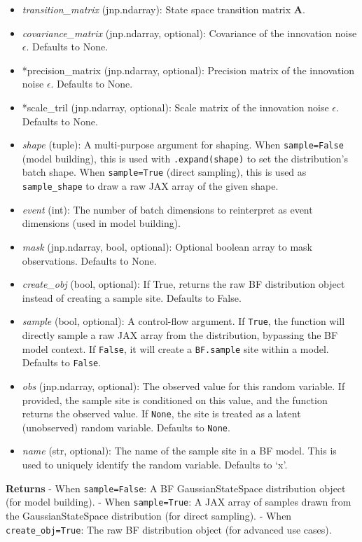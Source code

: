 \documentclass[
  letterpaper,
  DIV=11,
  numbers=noendperiod]{scrartcl}
\begin{document}
\begin{itemize}
\item
  \emph{transition\_matrix} (jnp.ndarray): State space transition matrix
  \(\mathbf{A}\).
\item
  \emph{covariance\_matrix} (jnp.ndarray, optional): Covariance of the
  innovation noise \({\epsilon}\). Defaults to None.
\item
  *precision\_matrix (jnp.ndarray, optional): Precision matrix of the
  innovation noise \(\epsilon\). Defaults to None.
\item
  *scale\_tril (jnp.ndarray, optional): Scale matrix of the innovation
  noise \(\epsilon\). Defaults to None.
\item
  \emph{shape} (tuple): A multi-purpose argument for shaping. When
  \texttt{sample=False} (model building), this is used with
  \texttt{.expand(shape)} to set the distribution's batch shape. When
  \texttt{sample=True} (direct sampling), this is used as
  \texttt{sample\_shape} to draw a raw JAX array of the given shape.
\item
  \emph{event} (int): The number of batch dimensions to reinterpret as
  event dimensions (used in model building).
\item
  \emph{mask} (jnp.ndarray, bool, optional): Optional boolean array to
  mask observations. Defaults to None.
\item
  \emph{create\_obj} (bool, optional): If True, returns the raw BF
  distribution object instead of creating a sample site. Defaults to
  False.
\item
  \emph{sample} (bool, optional): A control-flow argument. If
  \texttt{True}, the function will directly sample a raw JAX array from
  the distribution, bypassing the BF model context. If \texttt{False},
  it will create a \texttt{BF.sample} site within a model. Defaults to
  \texttt{False}.
\item
  \emph{obs} (jnp.ndarray, optional): The observed value for this random
  variable. If provided, the sample site is conditioned on this value,
  and the function returns the observed value. If \texttt{None}, the
  site is treated as a latent (unobserved) random variable. Defaults to
  \texttt{None}.
\item
  \emph{name} (str, optional): The name of the sample site in a BF
  model. This is used to uniquely identify the random variable. Defaults
  to `x'.
\end{itemize}

\textbf{Returns} - When \texttt{sample=False}: A BF GaussianStateSpace
distribution object (for model building). - When \texttt{sample=True}: A
JAX array of samples drawn from the GaussianStateSpace distribution (for
direct sampling). - When \texttt{create\_obj=True}: The raw BF
distribution object (for advanced use cases).
\end{document}
